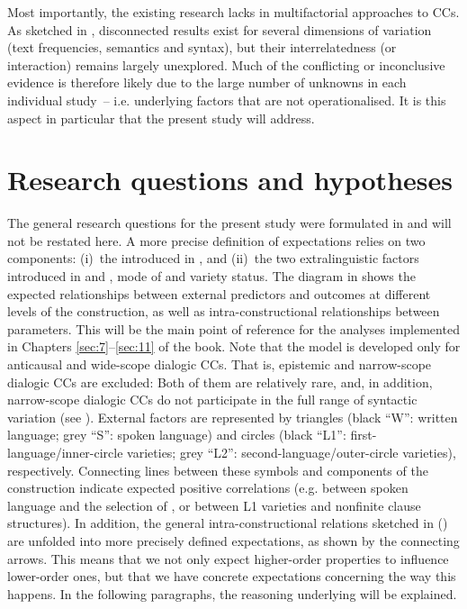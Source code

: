 Most importantly, the existing research lacks in multifactorial approaches to CCs. As sketched in , disconnected results exist for several dimensions of variation (text frequencies, semantics and syntax), but their interrelatedness (or interaction) remains largely unexplored. Much of the conflicting or inconclusive evidence is therefore likely due to the large number of unknowns in each individual study~– i.e. underlying factors that are not operationalised. It is this aspect in particular that the present study will address.

\section{\label{bkm:Ref3388422}\label{bkm:Ref3390733}\label{bkm:Ref61176821}Research questions and hypotheses}\label{sec:5.3}

The general research questions for the present study were formulated in  and will not be restated here. A more precise definition of expectations relies on two components:
(i)~the  introduced in , and
(ii)~the two extralinguistic factors introduced in  and , mode of  and variety status. The diagram in  shows the expected relationships between external predictors and outcomes at different levels of the construction, as well as intra-constructional relationships between parameters. This will be the main point of reference for the analyses implemented in Chapters \ref{sec:7}–\ref{sec:11} of the book. Note that the model is developed only for anticausal and wide-scope dialogic CCs. That is, epistemic and narrow-scope dialogic CCs are excluded: Both of them are relatively rare, and, in addition, narrow-scope dialogic CCs do not participate in the full range of syntactic variation (see ). External factors are represented by triangles (black “W”: written language; grey “S”: spoken language) and circles (black “L1”: first-language/inner-circle varieties; grey “L2”: second-language/outer-circle varieties), respectively. Connecting lines between these symbols and components of the construction indicate expected positive correlations (e.g. between spoken language and the selection of , or between L1 varieties and nonfinite clause structures). In addition, the general intra-constructional relations sketched in  () are unfolded into more precisely defined expectations, as shown by the connecting arrows. This means that we not only expect higher-order properties to influence lower-order ones, but that we have concrete expectations concerning the way this happens. In the following paragraphs, the reasoning underlying  will be explained.

